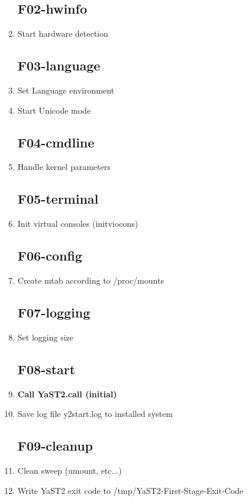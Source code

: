 \begin{enumerate}
\subsection{F02-hwinfo}
\item Start hardware detection
\subsection{F03-language}
\item Set Language environment
\item Start Unicode mode
\subsection{F04-cmdline}
\item Handle kernel parameters
\subsection{F05-terminal}
\item Init virtual consoles (initviocons)
\subsection{F06-config}
\item Create mtab according to /proc/mounts
\subsection{F07-logging}
\item Set logging size
\subsection{F08-start}
\item \textbf{Call YaST2.call (initial)}
\item Save log file y2start.log to installed system
\subsection{F09-cleanup}
\item Clean sweep (umount, etc...)
\item Write YaST2 exit code to /tmp/YaST2-First-Stage-Exit-Code
\end{enumerate}

